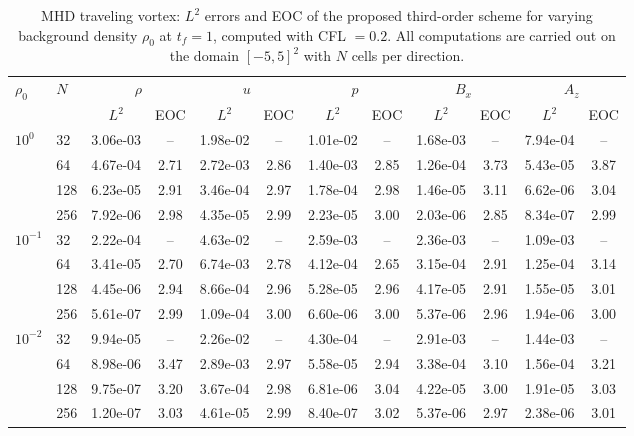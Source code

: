 \documentclass[a4paper,fleqn]{cas-sc}
\theoremstyle{remark}
\begin{document}
\begin{table}[pos=htbp]
\centering
\footnotesize
\setlength{\tabcolsep}{4pt}
\caption{MHD traveling vortex: $L^2$ errors and EOC of the proposed third-order
scheme for varying background density $\rho_0$ at $t_f=1$, computed with CFL $=0.2$.
All computations are carried out on the domain $[-5,5]^2$ with $N$ cells per
direction.}
\label{tab:vortex_eoc_o3}
\begin{tabular}{ll*{5}{rc}}
\toprule
$\rho_0$ & $N$ & \multicolumn{2}{c}{$\rho$} & \multicolumn{2}{c}{$u$} & \multicolumn{2}{c}{$p$} & \multicolumn{2}{c}{$B_x$} & \multicolumn{2}{c}{$A_z$} \\
 & & \multicolumn{1}{c}{$L^2$} & EOC & \multicolumn{1}{c}{$L^2$} & EOC & \multicolumn{1}{c}{$L^2$} & EOC & \multicolumn{1}{c}{$L^2$} & EOC & \multicolumn{1}{c}{$L^2$} & EOC \\
\midrule
$10^{0}$  & 32   & 3.06e-03 & --   & 1.98e-02 & --   & 1.01e-02 & --   & 1.68e-03 & --   & 7.94e-04 & --   \\
          & 64   & 4.67e-04 & 2.71 & 2.72e-03 & 2.86 & 1.40e-03 & 2.85 & 1.26e-04 & 3.73 & 5.43e-05 & 3.87 \\
          & 128  & 6.23e-05 & 2.91 & 3.46e-04 & 2.97 & 1.78e-04 & 2.98 & 1.46e-05 & 3.11 & 6.62e-06 & 3.04 \\
          & 256  & 7.92e-06 & 2.98 & 4.35e-05 & 2.99 & 2.23e-05 & 3.00 & 2.03e-06 & 2.85 & 8.34e-07 & 2.99 \\
$10^{-1}$ & 32   & 2.22e-04 & --   & 4.63e-02 & --   & 2.59e-03 & --   & 2.36e-03 & --   & 1.09e-03 & --   \\
          & 64   & 3.41e-05 & 2.70 & 6.74e-03 & 2.78 & 4.12e-04 & 2.65 & 3.15e-04 & 2.91 & 1.25e-04 & 3.14 \\
          & 128  & 4.45e-06 & 2.94 & 8.66e-04 & 2.96 & 5.28e-05 & 2.96 & 4.17e-05 & 2.91 & 1.55e-05 & 3.01 \\
          & 256  & 5.61e-07 & 2.99 & 1.09e-04 & 3.00 & 6.60e-06 & 3.00 & 5.37e-06 & 2.96 & 1.94e-06 & 3.00 \\
$10^{-2}$ & 32   & 9.94e-05 & --   & 2.26e-02 & --   & 4.30e-04 & --   & 2.91e-03 & --   & 1.44e-03 & --   \\
          & 64   & 8.98e-06 & 3.47 & 2.89e-03 & 2.97 & 5.58e-05 & 2.94 & 3.38e-04 & 3.10 & 1.56e-04 & 3.21 \\
          & 128  & 9.75e-07 & 3.20 & 3.67e-04 & 2.98 & 6.81e-06 & 3.04 & 4.22e-05 & 3.00 & 1.91e-05 & 3.03 \\
          & 256  & 1.20e-07 & 3.03 & 4.61e-05 & 2.99 & 8.40e-07 & 3.02 & 5.37e-06 & 2.97 & 2.38e-06 & 3.01 \\

\end{tabular}
\end{table}
\end{document}
